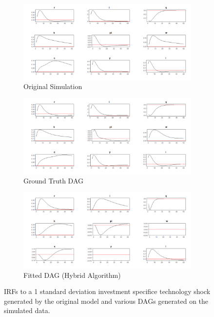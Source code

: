 \documentclass{article}
\begin{document}
\begin{figure}

  \centering
  \begin{subfigure}{0.8\textwidth}
    \centering
    \includegraphics[width=\linewidth]{images/sw_sim_qs_irf.png} 
    \caption{Original Simulation}
    \label{sw_simirf}
  \end{subfigure}
  \begin{subfigure}{0.8\textwidth}
    \centering  
    \includegraphics[width=\linewidth]{images/sw_gt_qs_irf.png}
    \caption{Ground Truth DAG}
    \label{sw_gtirf}
  \end{subfigure}
  \begin{subfigure}{0.8\textwidth}
    \centering  
    \includegraphics[width=\linewidth]{images/sw_hybrid_01_qs_irfs.png}
    \caption{Fitted DAG (Hybrid Algorithm)}
    \label{sw_hirf}
  \end{subfigure}

  \caption{IRFs to a 1 standard deviation investment specifice technology shock generated by the original model and various DAGs generated on the simulated data.}
  \label{swirf}
\end{figure}
\end{document}
